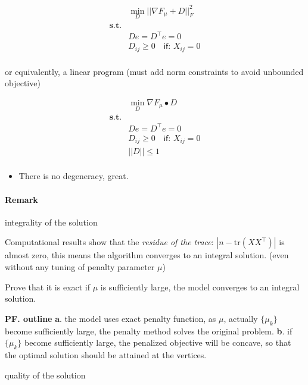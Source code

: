 \documentclass[
  10pt,
  a4paper,
,tablecaptionabove
]{scrartcl}
\providecommand{\tightlist}{%
  \setlength{\itemsep}{0pt}\setlength{\parskip}{0pt}}
\renewenvironment{quote}{\begin{customblockquote}\list{}{\rightmargin=0em\leftmargin=0em}%
\item\relax\color{blockquote-text}\ignorespaces}{\unskip\unskip\endlist\end{customblockquote}}
\begin{document}
\[\begin{aligned}
&\min_D ||\nabla F_\mu + D ||_F^2  \\
\mathbf{s.t.} & \\
&D e = D^\top e = 0 \\ 
&D_{ij} \ge 0 \quad \textsf{if: } X_{ij} = 0\\
\end{aligned}\]

or equivalently, a linear program (must add norm constraints to avoid
unbounded objective)

\[\begin{aligned}
&\min_D \nabla F_\mu \bullet D   \\
\mathbf{s.t.} & \\
&D e = D^\top e = 0 \\ 
&D_{ij} \ge 0 \quad \textsf{if: } X_{ij} = 0\\ 
&||D||\le 1 \\
\end{aligned}\]

\begin{itemize}
\tightlist
\item
  There is no degeneracy, great.
\end{itemize}

\hypertarget{remark}{%
\paragraph{Remark}\label{remark}}

\begin{quote}
integrality of the solution
\end{quote}

Computational results show that the \emph{residue of the trace}:
\(|n - \textrm{tr}(XX^\top)|\) is almost zero, this means the algorithm
converges to an integral solution. (even without any tuning of penalty
parameter \(\mu\))

Prove that it is exact if \(\mu\) is sufficiently large, the model
converges to an integral solution.

\textbf{PF. outline} \textbf{a}. the model uses exact penalty function,
as \(\mu\), actually \(\{\mu_k\}\) become sufficiently large, the
penalty method solves the original problem. \textbf{b}. if \(\{\mu_k\}\)
become sufficiently large, the penalized objective will be concave, so
that the optimal solution should be attained at the vertices.

\begin{quote}
quality of the solution
\end{quote}
\end{document}
